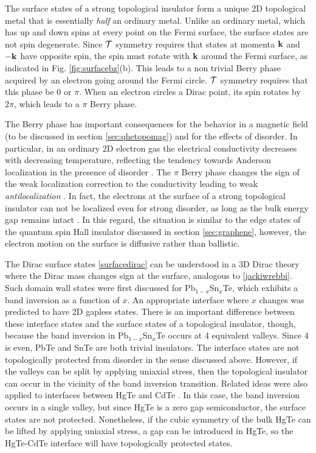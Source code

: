 \documentclass[twocolumn,floatfix,showpacs,rmp,aps]{revtex4}
\begin{document}
	The surface states of a strong topological insulator form a unique
	2D topological metal \cite{fukanemele07,fukane07} that is essentially {\it half}
	an ordinary metal.  Unlike an ordinary metal,
	which has up and down spins at every point on the Fermi surface, the surface
	states are not spin degenerate.  Since ${\cal T}$ symmetry requires that states at
	momenta ${\bf k}$ and $-{\bf k}$ have opposite spin, the spin must rotate with
	${\bf k}$ around the Fermi surface, as indicated in Fig.
	\ref{fig:surfacebz}(b).  This leads to a non trivial Berry phase
	acquired by an electron going around the Fermi
	circle.  ${\cal T}$ symmetry requires that this phase be $0$ or
	$\pi$.  When an electron circles a Dirac point, its spin rotates by
	$2\pi$, which leads to a $\pi$ Berry phase.
	
	The Berry phase has
	important consequences for the behavior in a magnetic field (to be
	discussed in section \ref{sec:qhetopomag}) and for the effects of disorder.  In
	particular, in an ordinary 2D electron gas the electrical
	conductivity decreases with decreasing temperature, reflecting the
	tendency towards Anderson localization in the presence of disorder \cite{lee85}.
	The $\pi$ Berry
	phase changes the sign of the weak localization correction to the
	conductivity leading to weak {\it antilocalization} \cite{suzuura02}.  In fact, the
	electrons at the surface of a strong topological insulator can not be
	localized even for strong disorder, as long as the bulk energy gap
	remains intact \cite{nomura07}.  In this regard, the situation is similar to the edge states of the
	quantum spin Hall insulator discussed in section \ref{sec:graphene}, however,
	the electron motion on the surface is diffusive rather than ballistic.
	
	The Dirac surface states \eqref{surfacedirac} can be
	understood in a 3D Dirac theory\cite{qihugheszhang08} where the Dirac mass changes sign at the
	surface, analogous to \eqref{jackiwrebbi}.  Such domain wall states were first
	discussed for Pb$_{1-x}$Sn$_x$Te\cite{volkov85,fradkin86},
	which exhibits a band inversion as a function of
	$x$.  An appropriate interface where $x$ changes was
	predicted to have 2D gapless states.  There is an important difference
	between these interface states and the surface
	states of a topological insulator, though, because the band inversion in
	Pb$_{1-x}$Sn$_x$Te occurs at 4 equivalent valleys.  Since 4 is even, PbTe and SnTe are
	both trivial insulators.  The interface states are not
	topologically protected from disorder in the sense discussed above.
	However, if the valleys can be split by applying uniaxial stress, then
	the topological insulator can occur in the vicinity of the band inversion
	transition\cite{fukane07}.
	Related ideas were also applied to interfaces between HgTe and CdTe
	\cite{chang85,cade85,linliu85,pankratovpakhomov87}.
	In this case, the band inversion occurs in a single valley, but since
	HgTe is a zero gap semiconductor, the surface states are not
	protected.  Nonetheless, if the cubic symmetry of the bulk HgTe can
	be lifted by applying uniaxial stress, a gap can be introduced in HgTe,
	so the HgTe-CdTe interface will have topologically protected states\cite{fukane07}.
	
\end{document}
